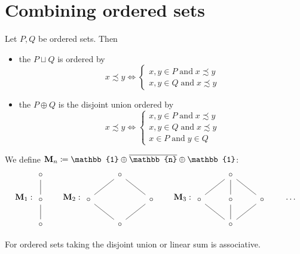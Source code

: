 \section{Combining ordered sets}
\begin{definition}
Let $P,Q$ be ordered sets. Then
\begin{itemize}
\item the  $P\sqcup Q$ is ordered by
\[ x\precsim y \iff \begin{cases}
x,y\in P \;\text{and}\; x\precsim y \\
x,y\in Q \;\text{and}\; x\precsim y
\end{cases} \]
\item the  $P\oplus Q$ is the disjoint union ordered by
\[ x\precsim y \iff \begin{cases}
x,y\in P \;\text{and}\; x\precsim y \\
x,y\in Q \;\text{and}\; x\precsim y \\
x\in P \;\text{and}\; y\in Q
\end{cases} \]
\end{itemize}
\end{definition}

\begin{example}
We define $\mathbf{M}_n \defeq \mathbb{1}\oplus \overline{\mathbb{n}} \oplus \mathbb{1}$:
\[ \mathbf{M}_1: \begin{tikzcd}
\circ \ar[d, dash] \\ \circ \ar[d, dash] \\ \circ
\end{tikzcd} \qquad \mathbf{M}_2: \begin{tikzcd}
&\circ \ar[ld, dash] \ar[rd, dash] & \\ \circ \ar[rd, dash] && \circ \ar[ld, dash] \\ &\circ &
\end{tikzcd} \qquad \mathbf{M}_3: \begin{tikzcd}
&\circ \ar[ld, dash] \ar[d,dash] \ar[rd, dash] &\\ \circ \ar[rd, dash]& \circ \ar[d, dash] & \circ \ar[ld, dash] \\ &\circ &
\end{tikzcd} \qquad \hdots \]
\end{example}

\begin{lemma}
For ordered sets taking the disjoint union or linear sum is associative.
\end{lemma}

